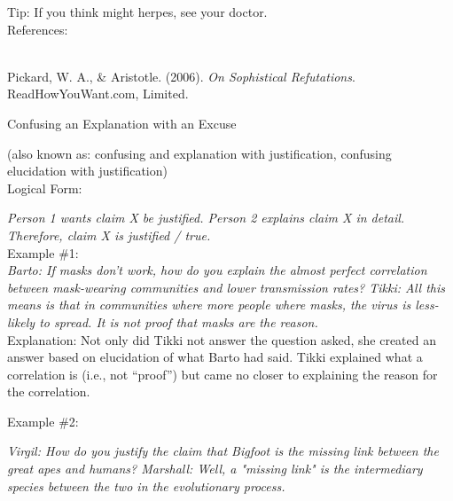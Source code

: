 \documentclass[a4paper,12pt,single,pdftex]{scrartcl}
\begin{document}
    
      Tip: If you think might herpes, see your doctor.
    \\

    References:

    
      
        
      \\

      
        
          Pickard, W. A., \& Aristotle. (2006). {\it On Sophistical Refutations}. ReadHowYouWant.com, Limited.
        
      
    
  

Confusing an Explanation with an Excuse
    
      (also known as: confusing and explanation with justification, confusing elucidation with justification)
    \\

  
    Logical Form:

    
      {\em Person 1 wants claim X be justified. \newline
Person 2 explains claim X in detail. \newline
Therefore, claim X is justified / true.}
    \\

    
      Example \#1:
    \\

    
      {\em Barto: If masks don’t work, how do you explain the almost perfect correlation between mask-wearing communities and lower transmission rates? \newline
Tikki: All this means is that in communities where more people where masks, the virus is less-likely to spread. It is not proof that masks are the reason.}
    \\

    
      Explanation: Not only did Tikki not answer the question asked, she created an answer based on elucidation of what Barto had said. Tikki explained what a correlation is (i.e., not “proof”) but came no closer to explaining the reason for the correlation.
    
    
      
    
    
      Example \#2: \newline
 \newline

    
    
      {\em Virgil: How do you justify the claim that Bigfoot is the missing link between the great apes and humans? \newline
Marshall: Well, a "missing link" is the intermediary species between the two in the evolutionary process. \newline
 \newline
}
    
\end{document}
